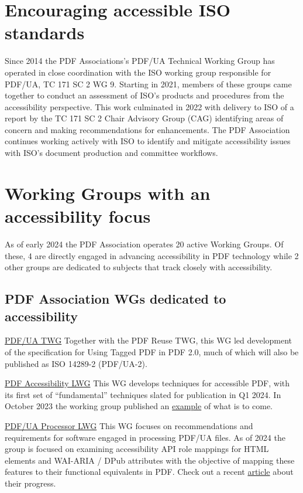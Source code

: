 \documentclass[12pt,a4paper]{article}
\begin{document}
\section{Encouraging accessible ISO
standards}\label{encouraging-accessible-iso-standards}

Since 2014 the PDF Associations's PDF/UA Technical Working Group has
operated in close coordination with the ISO working group responsible
for PDF/UA, TC 171 SC 2 WG 9. Starting in 2021, members of these groups
came together to conduct an assessment of ISO's products and procedures
from the accessibility perspective. This work culminated in 2022 with
delivery to ISO of a report by the TC 171 SC 2 Chair Advisory Group
(CAG) identifying areas of concern and making recommendations for
enhancements. The PDF Association continues working actively with ISO to
identify and mitigate accessibility issues with ISO's document
production and committee workflows.

\section{Working Groups with an accessibility
focus}\label{working-groups-with-an-accessibility-focus}

As of early 2024 the PDF Association operates 20 active Working Groups.
Of these, 4 are directly engaged in advancing accessibility in PDF
technology while 2 other groups are dedicated to subjects that track
closely with accessibility.

\subsection{PDF Association WGs dedicated to
accessibility}\label{pdf-association-wgs-dedicated-to-accessibility}

\href{https://pdfa.org/community/pdf-ua-technical-working-group/}{PDF/UA
TWG} Together with the PDF Reuse TWG, this WG led development of the
specification for Using Tagged PDF in PDF 2.0, much of which will also
be published as ISO 14289-2 (PDF/UA-2).

\href{https://pdfa.org/community/pdf-accessibility-liaison-working-group/}{PDF
Accessibility LWG} This WG develops techniques for accessible PDF, with
its first set of ``fundamental'' techniques slated for publication in Q1
2024. In October 2023 the working group published an
\href{https://pdfa.org/pdf-techniques-for-accessibility-a-new-model/}{example}
of what is to come.

\href{https://pdfa.org/community/pdf-ua-processor-lwg/}{PDF/UA Processor
LWG} This WG focuses on recommendations and requirements for software
engaged in processing PDF/UA files. As of 2024 the group is focused on
examining accessibility API role mappings for HTML elements and WAI-ARIA
/ DPub attributes with the objective of mapping these features to their
functional equivalents in PDF. Check out a recent
\href{https://pdfa.org/bridging-pdf-and-web-accessibility/}{article}
about their progress.
\end{document}
